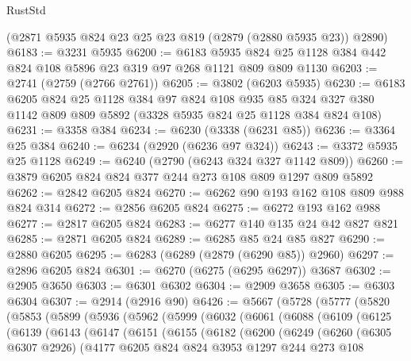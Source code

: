 \begin{lexlean}{RustStd}
\begin{coremodule}
    (@2871 @5935 @824 @23 @25 @23 @819 (@2879 (@2880 @5935 @23)) @2890)
@6183 := @3231 @5935
@6200 := @6183
    @5935
    @824
    @25
    @1128
    @384
    @442
    @824
    @108
    @5896
    @23
    @319
    @97
    @268
    @1121
    @809
    @809
    @1130
@6203 := @2741 (@2759 (@2766 @2761))
@6205 := @3802 (@6203 @5935)
@6230 := @6183
    @6205
    @824
    @25
    @1128
    @384
    @97
    @824
    @108
    @935
    @85
    @324
    @327
    @380
    @1142
    @809
    @809
    @5892
    (@3328 @5935 @824 @25 @1128 @384 @824 @108)
@6231 := @3358 @384
@6234 := @6230 (@3338 (@6231 @85))
@6236 := @3364 @25 @384
@6240 := @6234 (@2920 (@6236 @97 @324))
@6243 := @3372 @5935 @25 @1128
@6249 := @6240 (@2790 (@6243 @324 @327 @1142 @809))
@6260 := @3879 @6205 @824 @824 @377 @244 @273 @108 @809 @1297 @809 @5892
@6262 := @2842 @6205 @824
@6270 := @6262 @90 @193 @162 @108 @809 @988 @824 @314
@6272 := @2856 @6205 @824
@6275 := @6272 @193 @162 @988
@6277 := @2817 @6205 @824
@6283 := @6277 @140 @135 @24 @42 @827 @821
@6285 := @2871 @6205 @824
@6289 := @6285 @85 @24 @85 @827
@6290 := @2880 @6205
@6295 := @6283 (@6289 (@2879 (@6290 @85)) @2960)
@6297 := @2896 @6205 @824
@6301 := @6270 (@6275 (@6295 @6297)) @3687
@6302 := @2905 @3650
@6303 := @6301 @6302
@6304 := @2909 @3658
@6305 := @6303 @6304
@6307 := @2914 (@2916 @90)
@6426 := @5667
    (@5728
      (@5777
        (@5820
          (@5853
            (@5899
              (@5936
                (@5962
                  (@5999
                    (@6032
                      (@6061
                        (@6088
                          (@6109
                            (@6125
                              (@6139
                                (@6143
                                  (@6147
                                    (@6151
                                      (@6155
                                        (@6182
                                          (@6200
                                            (@6249
                                              (@6260
                                                (@6305 @6307 @2926)
                                                (@4177
                                                  @6205
                                                  @824
                                                  @824
                                                  @3953
                                                  @1297
                                                  @244
                                                  @273
                                                  @108

\end{coremodule}
\end{lexlean}
